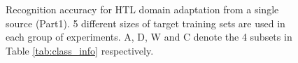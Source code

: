 \begin{figure}[th]
{}
\caption{Recognition accuracy for HTL domain adaptation from a single source (Part1). 5 different sizes of target training sets are used in each group of experiments. A, D, W and C denote the 4 subsets in Table \ref{tab:class_info} respectively.}
\label{fig:exp}
\end{figure}


